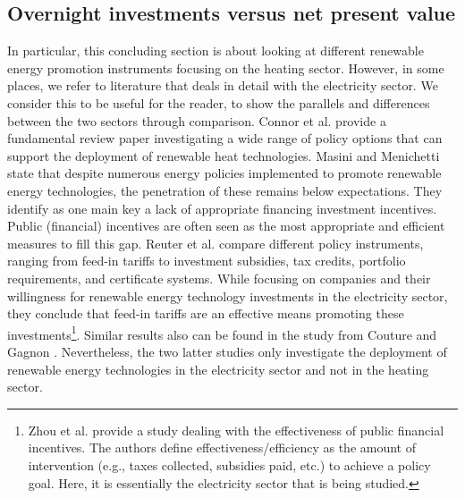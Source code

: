 \subsection{Overnight investments versus net present value}\label{aspect3}
In particular, this concluding section is about looking at different renewable energy promotion instruments focusing on the heating sector. However, in some places, we refer to literature that deals in detail with the electricity sector. We consider this to be useful for the reader, to show the parallels and differences between the two sectors through comparison. Connor et al. \cite{connor2013devising} provide a fundamental review paper investigating a wide range of policy options that can support the deployment of renewable heat technologies. Masini and Menichetti \cite{masini2012impact} state that despite numerous energy policies implemented to promote renewable energy technologies, the penetration of these remains below expectations. They identify as one main key a lack of appropriate financing investment incentives. Public (financial) incentives are often seen as the most appropriate and efficient measures to fill this gap. Reuter et al. \cite{reuter2012renewable} compare different policy instruments, ranging from feed-in tariffs to investment subsidies, tax credits, portfolio requirements, and certificate systems. While focusing on companies and their willingness for renewable energy technology investments in the electricity sector, they conclude that feed-in tariffs are an effective means promoting these investments\footnote{Zhou et al. \cite{zhou2011designing} provide a study dealing with the effectiveness of public financial incentives. The authors define effectiveness/efficiency as the amount of intervention (e.g., taxes collected, subsidies paid, etc.) to achieve a policy goal. Here, it is essentially the electricity sector that is being studied.}. Similar results also can be found in the study from Couture and Gagnon \cite{couture2010analysis}. Nevertheless, the two latter studies only investigate the deployment of renewable energy technologies in the electricity sector and not in the heating sector.\vspace{0.5cm} 

